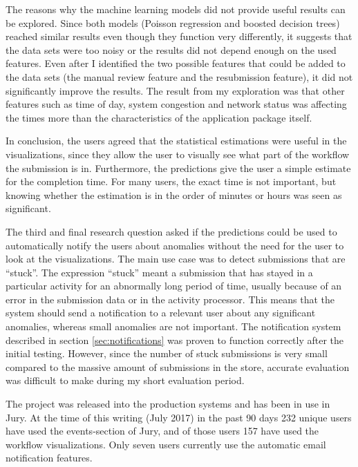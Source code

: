 
The reasons why the machine learning models did not provide useful results can be explored.
Since both models (Poisson regression and boosted decision trees) reached similar results even though they function very differently, it suggests that the data sets were too noisy or the results did not depend enough on the used features.
Even after I identified the two possible features that could be added to the data sets (the manual review feature and the resubmission feature), it did not significantly improve the results.
The result from my exploration was that other features such as time of day, system congestion and network status was affecting the times more than the characteristics of the application package itself.

In conclusion, the users agreed that the statistical estimations were useful in the visualizations, since they allow the user to visually see what part of the workflow the submission is in.
Furthermore, the predictions give the user a simple estimate for the completion time. 
For many users, the exact time is not important, but knowing whether the estimation is in the order of minutes or hours was seen as significant.


The third and final research question asked if the predictions could be used to automatically notify the users about anomalies without the need for the user to look at the visualizations.
The main use case was to detect submissions that are ``stuck''.
The expression ``stuck'' meant a submission that has stayed in a particular activity for an abnormally long period of time, usually because of an error in the submission data or in the activity processor.
This means that the system should send a notification to a relevant user about any significant anomalies, whereas small anomalies are not important.
The notification system described in section \ref{sec:notifications} was proven to function correctly after the initial testing. 
However, since the number of stuck submissions is very small compared to the massive amount of submissions in the store, accurate evaluation was difficult to make during my short evaluation period.

The project was released into the production systems and has been in use in Jury.
At the time of this writing (July 2017) in the past 90 days 232 unique users have used the events-section of Jury, and of those users 157 have used the workflow visualizations.
Only seven users currently use the automatic email notification features.

